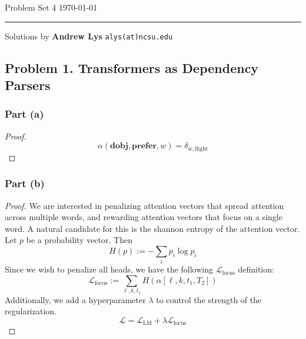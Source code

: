 \documentclass{amsart}
\newcommand{\cL}{\mathcal{L}}
\theoremstyle{definition}
\begin{document}
\noindent
Problem Set 4  \hfill \today  %
\smallskip
\hrule
\smallskip
\noindent
Solutions by {\bf Andrew Lys} \qquad   %
  {\tt alys(at)ncsu.edu}

\vspace{0.5cm}
\subsection*{Problem 1. Transformers as Dependency Parsers}
\subsubsection*{Part (a)} 
\begin{proof}
    \[
    \alpha(\mathbf{dobj}, \mathbf{prefer}, w) = \delta_{w, \text{flight}}
    \]
\end{proof}
\subsubsection*{Part (b)}
\begin{proof}
    We are interested in penalizing attention vectors that spread attention across multiple words, 
    and rewarding attention vectors that focus on a single word. 
    A natural candidate for this is the shannon entropy of the attention vector. Let $p$ be a probability vector. Then
    \[
    H(p) := -\sum_{i} p_i \log p_i
    \] 
    Since we wish to penalize all heads, we have the following $\cL_{\text{focus}}$ definition:
    \[
    \cL_{\text{focus}} := \sum_{\ell, k, t_1} H(\alpha[\ell, k, t_1, T_2])
    \]
    Additionally, we add a hyperparameter $\lambda$ to control the strength of the regularization.
    \[
    \cL = \cL_{\text{LM}} + \lambda \cL_{\text{focus}}
    \]
\end{proof}
\end{document}
